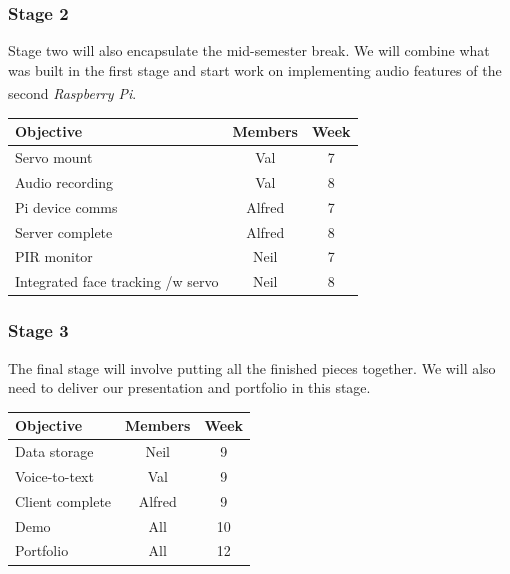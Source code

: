 \documentclass[11pt,a4paper,titlepage]{report}
\newcommand{\rpi}{\textit{Raspberry Pi\textsuperscript{\textregistered}}}
\begin{document}
\subsubsection{Stage 2}

Stage two will also encapsulate the mid-semester break. We will combine what was built in the first stage and start work on implementing audio features of the second \rpi.

\begin{center}
\begin{table}[H]
\begin{tabular}{|l|c|c|}
    \hline
    \textbf{Objective} & \textbf{Members} & \textbf{Week} \\ \hline
    
    Servo mount & Val & 7 \\ \hline
    Audio recording & Val & 8 \\ \hline
    Pi device comms & Alfred & 7 \\ \hline
    Server complete & Alfred & 8 \\ \hline
    PIR monitor & Neil & 7 \\ \hline
    Integrated face tracking /w servo & Neil & 8 \\ \hline


\end{tabular}
\end{table}
\end{center}


\subsubsection{Stage 3}

The final stage will involve putting all the finished pieces together. We will also need to deliver our presentation and portfolio in this stage.


\begin{center}
\begin{table}[H]
\begin{tabular}{|l|c|c|}
    \hline
    \textbf{Objective} & \textbf{Members} & \textbf{Week} \\ \hline

    Data storage & Neil & 9 \\ \hline    
    Voice-to-text & Val & 9 \\ \hline    
    Client complete & Alfred & 9 \\ \hline    
    Demo & All & 10 \\ \hline    
    Portfolio & All & 12 \\ \hline    

\end{tabular}
\end{table}
\end{center}
\end{document}
